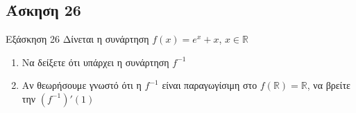 \documentclass[greek]{beamer}
\begin{document}
\subsection{Άσκηση 26}
\begin{frame}[label=Άσκηση26]{Εξάσκηση 26}
  Δίνεται η συνάρτηση $f(x)=e^x+x$, $x\in\mathbb{R}$
  \begin{enumerate}
    \item<1-> Να δείξετε ότι υπάρχει η συνάρτηση $f^{-1}$
    \item<2-> Αν θεωρήσουμε γνωστό ότι η $f^{-1}$ είναι παραγωγίσιμη στο $f(\mathbb{R})=\mathbb{R}$, να βρείτε την $(f^{-1})'(1)$
  \end{enumerate}

\end{frame}
\end{document}

